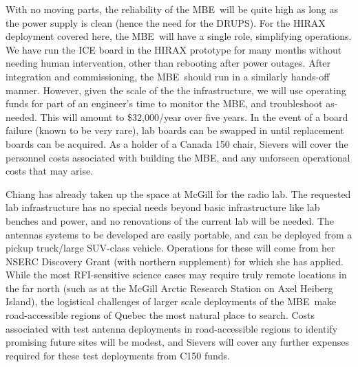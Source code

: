 \documentclass[letterpaper,11pt,preprint]{aastex}
\makeatletter
\newcommand{\mbe}{{\rm MBE}}
\def\section{\@startsection {section}{1}{\z@}{1.0ex plus 
1ex minus .2ex}{.2ex plus .2ex}{\large\bf}}
\makeatother
\begin{document}
With no moving parts, the reliability of the \mbe\ will be quite high
as long as the power supply is clean (hence the need for the DRUPS).
For the HIRAX deployment covered here, the \mbe\ will have a single
role, simplifying operations.  We have run the ICE board in the HIRAX
prototype for many months without needing human intervention, other
than rebooting after power outages.  After integration and
commissioning, the \mbe\ should run in a similarly hands-off manner.
However, given the scale of the the infrastructure, we will use
operating funds for part of an engineer's time to monitor the \mbe,
and troubleshoot as-needed.  This will amount to \$32,000/year over
five years.  In the event of a board failure (known to
be very rare), lab boards can be swapped in until replacement boards
can be acquired.  As a holder of a Canada 150 chair, Sievers will
cover the personnel costs associated with building the \mbe, and any
unforseen operational costs that may arise.

Chiang has already taken up the space at McGill for the radio lab.
The requested lab infrastructure has no special needs beyond basic
infrastructure like lab benches and power, and no renovations of the
current lab will be needed.  The antennas systems to be developed are
easily portable, and can be deployed from a pickup truck/large
SUV-class vehicle.  Operations for these will come from her NSERC
Discovery Grant (with northern supplement) for which she has applied.
While the most RFI-sensitive science cases may require truly remote
locations in the far north (such as at the McGill Arctic Research
Station on Axel Heiberg Island), the logistical challenges of larger
scale deployments of the \mbe\ make road-accessible regions of Quebec
the most natural place to search.  Costs associated with test antenna
deployments in road-accessible regions to identify promising future
sites will be modest, and Sievers will cover any further expenses
required for these test deployments from C150 funds.


\section{Benefits to Canada}
\end{document}
